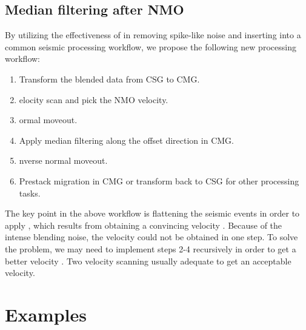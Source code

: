 
\subsection{Median filtering after NMO}
By utilizing the effectiveness of  in removing spike-like noise and inserting  into a common seismic processing workflow, we propose the following new processing workflow:
\begin{enumerate}
\item Transform the blended data from CSG to CMG.
\item {} elocity scan and pick the NMO velocity.
\item {} ormal moveout.
\item Apply median filtering along the offset direction in CMG.
\item {} nverse normal moveout.
\item Prestack migration in CMG or transform back to CSG for other processing tasks. 
\end{enumerate}

The key point in the above workflow is flattening the seismic events in order to apply  , which results from obtaining a convincing velocity . Because of the intense blending noise, the velocity  could not be obtained in one step. To solve the problem, we may need to implement steps 2-4 recursively\old{,} in order to get a better velocity . Two velocity scanning  usually adequate to get an acceptable velocity. 

\section{Examples}


